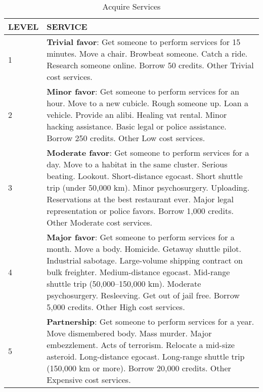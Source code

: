 \begin{table} \caption{Acquire Services} \begin{tabularx}{\textwidth}{|l|X|} \hline

LEVEL &SERVICE \\ \hline

1 &\textbf{Trivial favor}: Get someone to perform services for 15 minutes. Move a chair. Browbeat someone. Catch a ride. Research someone online. Borrow 50 credits. Other Trivial cost services. \\ \hline

2 &\textbf{Minor favor}: Get someone to perform services for an hour. Move to a new cubicle. Rough someone up. Loan a vehicle. Provide an alibi. Healing vat rental. Minor hacking assistance. Basic legal or police assistance. Borrow 250 credits. Other Low cost services. \\ \hline

3 &\textbf{Moderate favor}: Get someone to perform services for a day. Move to a habitat in the same cluster. Serious beating. Lookout. Short-distance egocast. Short shuttle trip (under 50,000 km). Minor psychosurgery. Uploading. Reservations at the best restaurant ever. Major legal representation or police favors. Borrow 1,000 credits. Other Moderate cost services. \\ \hline

4 &\textbf{Major favor}: Get someone to perform services for a month. Move a body. Homicide. Getaway shuttle pilot. Industrial sabotage. Large-volume shipping contract on bulk freighter. Medium-distance egocast. Mid-range shuttle trip (50,000–150,000 km). Moderate psychosurgery. Resleeving. Get out of jail free. Borrow 5,000 credits. Other High cost services. \\ \hline

5 &\textbf{Partnership}: Get someone to perform services for a year. Move dismembered body. Mass murder. Major embezzlement. Acts of terrorism. Relocate a mid-size asteroid. Long-distance egocast. Long-range shuttle trip (150,000 km or more). Borrow 20,000 credits. Other Expensive cost services. \\ \hline

\end{tabularx} \end{table} 





